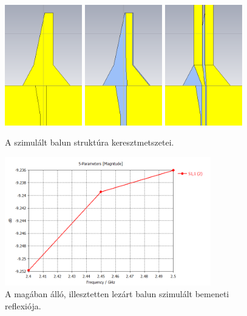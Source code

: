 \begin{figure}[h]
	\centering
	\includegraphics[width=0.3\textwidth]{kep/results/balun_1.png}
	\includegraphics[width=0.3\textwidth]{kep/results/balun_2.png}
	\includegraphics[width=0.3\textwidth]{kep/results/balun_3.png}
	\caption{A szimulált balun struktúra keresztmetszetei.}
	\label{fig:balun-kereszt}
\end{figure}
\begin{figure}[h]
	\centering
	\includegraphics[width=0.8\textwidth]{kep/results/balun_S11.png}
	\caption{A magában álló, illesztetten lezárt balun szimulált bemeneti reflexiója.}
	\label{fig:balun-s11}
\end{figure}
